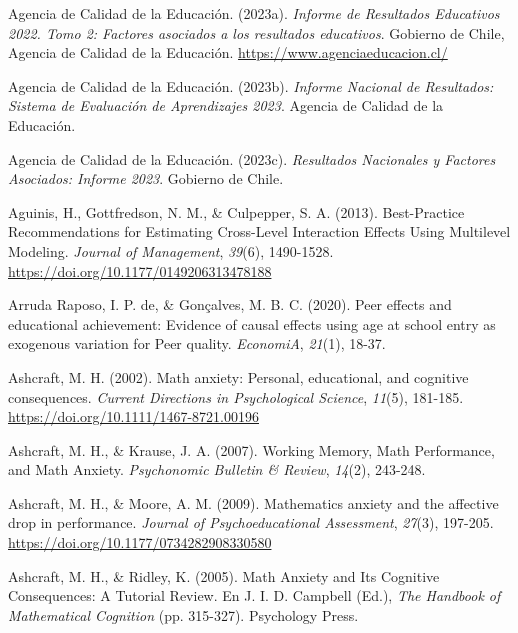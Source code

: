 \documentclass[
  spanish,
  a4paper,
  oneside]{scrbook}
\newlength{\cslhangindent}
\newenvironment{CSLReferences}[2] %
 {\begin{list}{}{%
  \setlength{\itemindent}{0pt}
  \setlength{\leftmargin}{0pt}
  \setlength{\parsep}{0pt}
  \ifodd #1
   \setlength{\leftmargin}{\cslhangindent}
   \setlength{\itemindent}{-1\cslhangindent}
  \fi
  \setlength{\itemsep}{#2\baselineskip}}}
 {\end{list}}
\begin{document}
\label{refs}
\begin{CSLReferences}{1}{0}
Agencia de Calidad de la Educación. (2023a). \emph{Informe de Resultados
Educativos 2022. Tomo 2: Factores asociados a los resultados
educativos}. Gobierno de Chile, Agencia de Calidad de la Educación.
\url{https://www.agenciaeducacion.cl/}

Agencia de Calidad de la Educación. (2023b). \emph{Informe Nacional de
Resultados: Sistema de Evaluaci{ó}n de Aprendizajes 2023}. Agencia de
Calidad de la Educaci{ó}n.

Agencia de Calidad de la Educación. (2023c). \emph{Resultados Nacionales
y Factores Asociados: Informe 2023}. Gobierno de Chile.

Aguinis, H., Gottfredson, N. M., \& Culpepper, S. A. (2013).
Best-Practice Recommendations for Estimating Cross-Level Interaction
Effects Using Multilevel Modeling. \emph{Journal of Management},
\emph{39}(6), 1490-1528. \url{https://doi.org/10.1177/0149206313478188}

Arruda Raposo, I. P. de, \& Gonçalves, M. B. C. (2020). Peer effects and
educational achievement: Evidence of causal effects using age at school
entry as exogenous variation for Peer quality. \emph{EconomiA},
\emph{21}(1), 18-37.

Ashcraft, M. H. (2002). Math anxiety: Personal, educational, and
cognitive consequences. \emph{Current Directions in Psychological
Science}, \emph{11}(5), 181-185.
\url{https://doi.org/10.1111/1467-8721.00196}

Ashcraft, M. H., \& Krause, J. A. (2007). Working Memory, Math
Performance, and Math Anxiety. \emph{Psychonomic Bulletin \& Review},
\emph{14}(2), 243-248.

Ashcraft, M. H., \& Moore, A. M. (2009). Mathematics anxiety and the
affective drop in performance. \emph{Journal of Psychoeducational
Assessment}, \emph{27}(3), 197-205.
\url{https://doi.org/10.1177/0734282908330580}

Ashcraft, M. H., \& Ridley, K. (2005). Math Anxiety and Its Cognitive
Consequences: A Tutorial Review. En J. I. D. Campbell (Ed.), \emph{The
Handbook of Mathematical Cognition} (pp. 315-327). Psychology Press.


\end{CSLReferences}
\end{document}

